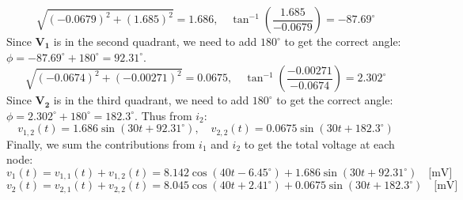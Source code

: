 \documentclass[12pt]{article}
\begin{document}
\[\sqrt{(-0.0679)^2+(1.685)^2} = 1.686, \quad \tan^{-1}\left(\frac{1.685}{-0.0679}\right) = -87.69^\circ\]
Since $\mathbf{V_1}$ is in the second quadrant, we need to add $180^\circ$ to get the correct angle: $\phi = -87.69^\circ + 180^\circ = 92.31^\circ$.
\[\sqrt{(-0.0674)^2+(-0.00271)^2} = 0.0675, \quad \tan^{-1}\left(\frac{-0.00271}{-0.0674}\right) = 2.302^\circ\]
Since $\mathbf{V_2}$ is in the third quadrant, we need to add $180^\circ$ to get the correct angle: $\phi = 2.302^\circ + 180^\circ = 182.3^\circ$.
Thus from $i_2$:
\[v_{1,2}(t) = 1.686\sin(30t + 92.31^\circ), \quad v_{2,2}(t) = 0.0675\sin(30t + 182.3^\circ)\]
Finally, we sum the contributions from $i_1$ and $i_2$ to get the total voltage at each node:
\[\boxed{v_1(t) = v_{1,1}(t) + v_{1,2}(t) = 8.142\cos(40t - 6.45^\circ) + 1.686\sin(30t + 92.31^\circ)\quad\text{[mV]}}\]
\[\boxed{v_2(t) = v_{2,1}(t) + v_{2,2}(t) = 8.045\cos(40t + 2.41^\circ) + 0.0675\sin(30t + 182.3^\circ)\quad\text{[mV]}}\]
\end{document}
